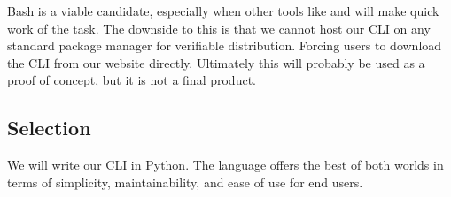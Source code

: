 Bash is a viable candidate, especially when other tools like  and  will make quick work of the task.
The downside to this is that we cannot host our CLI on any standard package manager for verifiable distribution. Forcing users to download the CLI from our website directly.
Ultimately this will probably be used as a proof of concept, but it is not a final product.

\subsection{Selection}

We will write our CLI in Python.
The language offers the best of both worlds in terms of simplicity, maintainability, and ease of use for end users.
